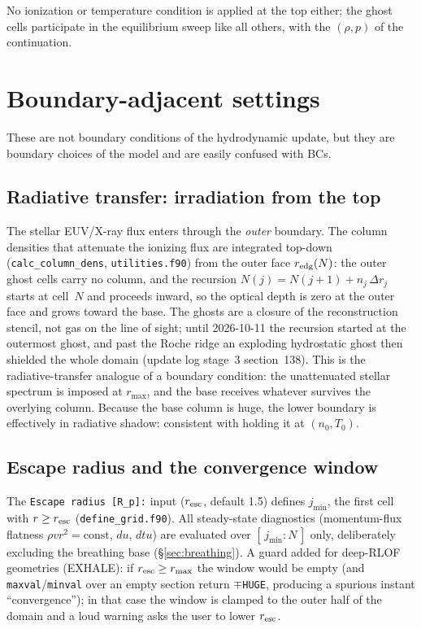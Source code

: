 \documentclass[english,a4paper]{my_memo}
\begin{document}
No ionization or temperature condition is applied at the top either;
the ghost cells participate in the equilibrium sweep like all others,
with the $(\rho, p)$ of the continuation.

\section{Boundary-adjacent settings}
\label{sec:adjacent}

These are not boundary conditions of the hydrodynamic update, but they
are boundary choices of the model and are easily confused with BCs.

\subsection{Radiative transfer: irradiation from the top}

The stellar EUV/X-ray flux enters through the \emph{outer} boundary.
The column densities that attenuate the ionizing flux are integrated
top-down (\texttt{calc\_column\_dens}, \texttt{utilities.f90}) from the
outer face $r_{\rm edg}(N)$: the outer ghost cells carry no column, and the
recursion $N(j) = N(j{+}1) + n_j\,\Delta r_j$ starts at cell~$N$ and
proceeds inward, so the optical depth is zero at the outer face and grows
toward the base. The ghosts are a closure of the reconstruction stencil, not
gas on the line of sight; until 2026-10-11 the recursion started at the
outermost ghost, and past the Roche ridge an exploding hydrostatic ghost
then shielded the whole domain (update log stage~3 section~138). This is the
radiative-transfer analogue of a boundary condition: the unattenuated
stellar spectrum is imposed at $r_{\max}$,
and the base receives whatever survives the overlying column. Because
the base column is huge, the lower boundary is effectively in
radiative shadow: consistent with holding it at $(n_0, T_0)$.

\subsection{Escape radius and the convergence window}
\label{sec:resc}

The \texttt{Escape radius [R\_p]:} input ($r_{\rm esc}$, default 1.5)
defines $j_{\min}$, the first cell with $r \ge r_{\rm esc}$
(\texttt{define\_grid.f90}). All steady-state diagnostics
(momentum-flux flatness $\rho v r^2 = \mathrm{const}$, $du$, $dtu$)
are evaluated over $[\,j_{\min} : N\,]$ only, deliberately excluding
the breathing base (\S\ref{sec:breathing}). A guard added for deep-RLOF
geometries (EXHALE): if $r_{\rm esc} \ge r_{\max}$ the window would be
empty (and \texttt{maxval}/\texttt{minval} over an empty section
return $\mp$\texttt{HUGE}, producing a spurious instant
``convergence''); in that case the window is clamped to the outer half
of the domain and a loud warning asks the user to lower
$r_{\rm esc}$.
\end{document}

